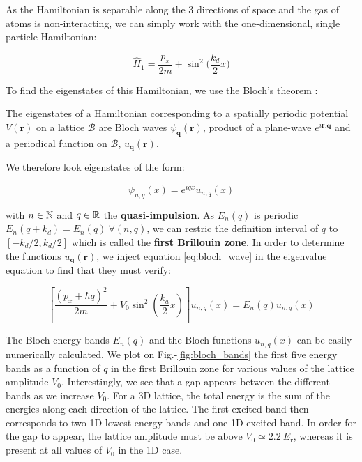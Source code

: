 \noindent As the Hamiltonian is separable along the 3 directions of space and the gas of atoms is non-interacting, we can simply work with the one-dimensional, single particle Hamiltonian:

\begin{equation}
    \hat{H}_1 = \frac{p_x}{2m} + \sin^2 \Big(\frac{k_d}{2} x \Big)
\end{equation}

\noindent To find the eigenstates of this Hamiltonian, we use the Bloch's theorem \cite{ashcroft1976solid}:

\begin{tcolorbox}[colback=red!5!white,colframe=red!75!black,title=\textbf{Bloch's theorem}]
\label{sec:bloch}
The eigenstates of a Hamiltonian corresponding to a spatially periodic potential $V(\bm{r})$ on a lattice $\mathcal{B}$ are Bloch waves $\psi_{\bm{q}}(\bm{r})$, product of a plane-wave $e^{i \bm{r}.\bm{q}}$ and a periodical function on $\mathcal{B}$, $u_{\bm{q}} (\bm{r})$.
\end{tcolorbox}

We therefore look eigenstates of the form:

\begin{equation}
    \psi_{n,q} (x)= e^{iqx} u_{n,q} (x)
    \label{eq:bloch_wave}
\end{equation}

\noindent with $n \in \mathbb{N}$ and $q \in \mathbb{R}$ the \textbf{quasi-impulsion}. As $E_n (q)$ is periodic $E_n (q+k_d)= E_n(q) \ \forall (n,q)$, we can restric the definition interval of $q$ to $[-k_d/2, k_d/2]$ which is called the \textbf{first Brillouin zone}. In order to determine the functions $u_{\bm{q}} (\bm{r})$, we inject equation \ref{eq:bloch_wave} in the eigenvalue equation to find that they must verify:

\begin{equation}
    \left[\frac{\left(p_{x}+\hbar q\right)^{2}}{2 m}+V_{0} \sin ^{2}\left(\frac{k_{a}}{2} x\right)\right] u_{n, q}(x)=E_{n}(q) u_{n, q}(x)
\end{equation}

The Bloch energy bands $E_{n}(q)$ and the Bloch functions $u_{n, q}(x)$ can be easily numerically calculated. We plot on Fig.-\ref{fig:bloch_bands} the first five energy bands as a function of $q$ in the first Brillouin zone for various values of the lattice amplitude $V_0$. Interestingly, we see that a gap appears between the different bands as we increase $V_0$. For a 3D lattice, the total energy is the sum of the energies along each direction of the lattice. The first excited band then corresponds to two 1D lowest energy bands and one 1D excited band. In order for the gap to appear, the lattice amplitude must be above $V_0 \simeq 2.2 \ E_{\mathrm{r}}$, whereas it is present at all values of $V_0$ in the 1D case.

